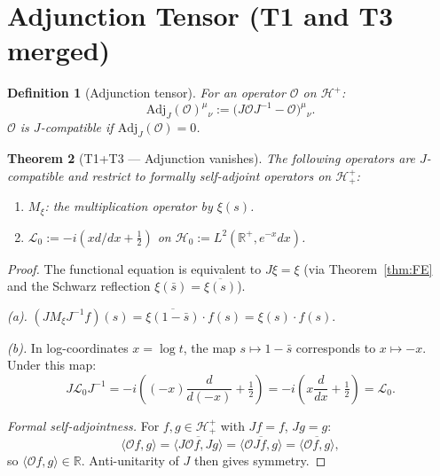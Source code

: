\documentclass[12pt,a4paper]{article}
\newtheorem{theorem}{Theorem}[section]
\newtheorem{definition}[theorem]{Definition}
\theoremstyle{remark}
\newcommand{\Adj}{\mathrm{Adj}}
\begin{document}
\section{Adjunction Tensor (T1 and T3 merged)}
\label{sec:adjunction}

\begin{definition}[Adjunction tensor]
For an operator $\mathcal{O}$ on $\mathcal{H}^+$:
\[
\Adj_J(\mathcal{O})^{\mu}{}_\nu
:= \bigl(J\mathcal{O}J^{-1}-\mathcal{O}\bigr)^{\mu}{}_\nu.
\]
$\mathcal{O}$ is \emph{$J$-compatible} if $\Adj_J(\mathcal{O})=0$.
\end{definition}

\begin{theorem}[T1+T3 --- Adjunction vanishes]\label{thm:T13}
The following operators are $J$-compatible and restrict to formally
self-adjoint operators on $\mathcal{H}^+_+$:
\begin{enumerate}[label=(\alph*),leftmargin=*]
\item $M_\xi$: the multiplication operator by $\xi(s)$.
\item $\mathcal{L}_0:=-i\!\left(xd/dx+\tfrac{1}{2}\right)$
on $\mathcal{H}_0:=L^2(\mathbb{R}^+,e^{-x}dx)$.
\end{enumerate}
\end{theorem}
\begin{proof}
The functional equation is equivalent to $J\xi=\xi$
(via Theorem~\ref{thm:FE} and the Schwarz reflection
$\xi(\bar{s})=\overline{\xi(s)}$).

\emph{(a).}
$(JM_\xi J^{-1}f)(s)=\overline{\xi(1-\bar{s})}\cdot f(s)=\xi(s)\cdot f(s)$.

\emph{(b).}
In log-coordinates $x=\log t$, the map $s\mapsto1-\bar{s}$
corresponds to $x\mapsto-x$. Under this map:
\[
J\mathcal{L}_0 J^{-1}
= -i\!\left((-x)\frac{d}{d(-x)}+\tfrac{1}{2}\right)
= -i\!\left(x\frac{d}{dx}+\tfrac{1}{2}\right) = \mathcal{L}_0.
\]

\emph{Formal self-adjointness.}
For $f,g\in\mathcal{H}^+_+$ with $Jf=f$, $Jg=g$:
\[
\langle\mathcal{O}f,g\rangle
= \overline{\langle J\mathcal{O}f,Jg\rangle}
= \overline{\langle\mathcal{O}Jf,g\rangle}
= \overline{\langle\mathcal{O}f,g\rangle},
\]
so $\langle\mathcal{O}f,g\rangle\in\mathbb{R}$.
Anti-unitarity of $J$ then gives symmetry.
\end{proof}
\end{document}
